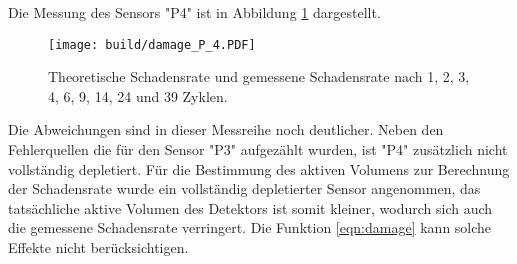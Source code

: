 Die Messung des Sensors "P4" ist in Abbildung \ref{fig:P_4}
dargestellt.

\begin{figure}
    \texttt{[image: build/damage\_P\_4.PDF]}
\caption{Theoretische Schadensrate und gemessene Schadensrate nach 1, 2, 3, 4, 6, 9, 14, 24 und 39 Zyklen.}
\label{fig:P_4}
\end{figure}

Die Abweichungen sind in dieser Messreihe noch deutlicher. Neben den Fehlerquellen die
für den Sensor "P3" aufgezählt wurden, ist "P4" zusätzlich nicht vollständig depletiert.
Für die Bestimmung des aktiven Volumens zur Berechnung der Schadensrate wurde ein vollständig
depletierter Sensor angenommen, das tatsächliche aktive Volumen des Detektors ist somit kleiner, wodurch sich auch
die gemessene Schadensrate verringert.
Die Funktion \ref{eqn:damage} kann solche Effekte nicht berücksichtigen.

